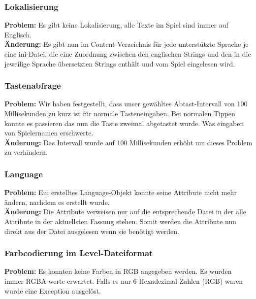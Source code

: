 \subsubsection*{Lokalisierung}

\textbf{Problem:}
Es gibt keine Lokalisierung, alle Texte im Spiel sind immer auf Englisch.\\

\textbf{Änderung:} Es gibt nun im Content-Verzeichnis für jede unterstützte Sprache je eine ini-Datei, die eine Zuordnung zwischen den englischen Strings und den in die jeweilige Sprache übersetzten Strings enthält und vom Spiel eingelesen wird.\\



\subsubsection*{Tastenabfrage}
\textbf{Problem:}
Wir haben festgestellt, dass unser gewähltes Abtast-Intervall von 100 Millisekunden zu kurz ist für normale Tasteneingaben. Bei normalen Tippen konnte es passieren das nun die Taste zweimal abgetastet wurde. Was eingaben von Spielernamen erschwerte.\\

\textbf{Änderung:} Das Intervall wurde auf 100 Millisekunden erhöht um dieses Problem zu verhindern.\\



\subsubsection*{Language}
\textbf{Problem:}
Ein erstelltes Language-Objekt konnte seine Attribute nicht mehr ändern, nachdem es erstellt wurde.\\
\textbf{Änderung:} Die Attribute verweisen nur auf die entsprechende Datei in der alle Attribute in der aktuellsten Fassung stehen. Somit werden die Attribute nun direkt aus der Datei ausgelesen wenn sie benötigt werden.



\subsubsection*{Farbcodierung im Level-Dateiformat}

\textbf{Problem:}
Es konnten keine Farben in RGB angegeben werden. Es wurden immer RGBA werte erwartet.
Falls es nur 6 Hexadezimal-Zahlen (RGB) waren wurde eine Exception ausgelöst.\\

